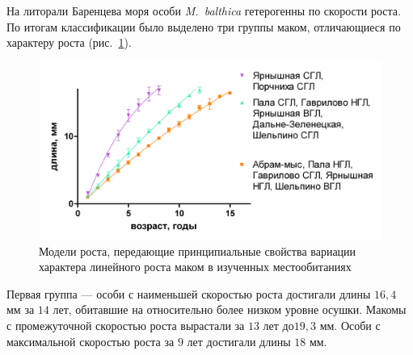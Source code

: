 {{На литорали Баренцева моря особи \textit{M.~balthica} гетерогенны по скорости роста. По   итогам   классификации   было   выделено   три   группы   маком,   отличающиеся   по характеру роста (рис.~\ref{ris:Barents_clusters_gorizonts_all}).
    \begin{figure}[]
        \includegraphics[width=\textwidth]{../Barenc_Sea/growth_from_MSc/rost_clusters_all.jpg}
    \caption{Модели роста, передающие  принципиальные свойства вариации характера линейного роста маком в изученных местообитаниях}
    \label{ris:Barents_clusters_gorizonts_all}
    \end{figure}
Первая группа — особи с наименьшей скоростью роста достигали длины $16,4$ мм за $14$ лет, обитавшие на относительно более низком уровне осушки. 
Макомы с промежуточной   скоростью   роста   вырастали   за   $13$   лет   $до   19,3$   мм.   
Особи   с   максимальной скоростью роста за $9$ лет достигали длины $18$ мм.

}}
